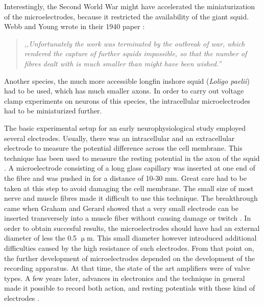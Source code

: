 Interestingly, the Second World War might have accelerated the miniaturization of the microelectrodes, because it restricted the availability of the giant squid.
Webb and Young wrote in their 1940 paper \cite{webb1940electrolyte}:

\begin{quote}
\vspace{0.5cm}
\emph{,,Unfortunately the work was terminated by the outbreak of war, which rendered the capture of further squids impossible, so that the number of fibres dealt with is much smaller than might have been wished.''}
\vspace{0.5cm}
\end{quote} 

Another species, the much more accessible longfin inshore squid (\emph{Loligo paelii}) had to be used, which has much smaller axons.
In order to carry out voltage clamp experiments on neurons of this species, the intracellular microelectrodes had to be miniaturized further.

The basic experimental setup for an early neurophysiological study employed several electrodes.
Usually, there was an intracellular and an extracellular electrode to measure the potential difference across the cell membrane.
This technique has been used to measure the resting potential in the axon of the squid \cite{curtis1940membrane, curtis1942membrane}.
A microelectrode consisting of a long glass capillary was inserted at one end of the fibre and was pushed in for a distance of 10-30 mm.
Great care had to be taken at this step to avoid damaging the cell membrane.
The small size of most nerve and muscle fibres made it difficult to use this technique.
The breakthrough came when Graham and Gerard showed that a very small electrode can be inserted transversely into a muscle fiber without causing damage or twitch \cite{graham1946judith, ling1949normal}.
In order to obtain succesful results, the microelectrodes should have had an external diameter of less the 0.5 $\upmu$m.
This small diameter however introduced additional difficulties caused by the high resistance of such electrodes.
From that point on, the further development of microelectrodes depended on the development of the recording apparatus.
At that time, the state of the art amplifiers were of valve types.
A few years later, advances in electronics and the technique in general made it possible to record both action, and resting potentials with these kind of electrodes \cite{hodgkin1949membrane, nastuk1950electrical}.

